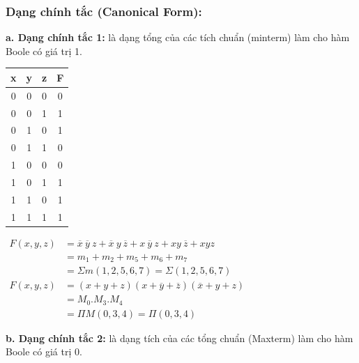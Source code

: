 \subsubsection{Dạng chính tắc (Canonical Form):}
\textbf{a. Dạng chính tắc 1:} là dạng tổng của các tích chuẩn (minterm) làm cho hàm Boole có giá trị 1.
\begin{table}[h!]
    \centering
    \begin{tabular}{|ccc|c|}
    \hline
    \textbf{x} & \textbf{y} & \textbf{z} & \textbf{F} \\ \hline
    0          & 0          & 0          & 0          \\
    0          & 0          & 1          & 1          \\
    0          & 1          & 0          & 1          \\
    0          & 1          & 1          & 0          \\
    1          & 0          & 0          & 0          \\
    1          & 0          & 1          & 1          \\
    1          & 1          & 0          & 1          \\
    1          & 1          & 1          & 1          \\ \hline
    \end{tabular}
    \qquad
    $\begin{aligned}
        F(x,y,z) &= \overline{x}\ \overline{y}\ z  + \overline{x}\ y\ \overline{z} + x\ \overline{y}\ z + xy\ \overline{z} + xyz \\
                 &= m_1 + m_2 + m_5 + m_6 + m_7 \\
                 &= \varSigma m(1,2,5,6,7) = \varSigma (1,2,5,6,7) \\
        F(x,y,z) &= (x+y+z)(x+ \overline{y} + \overline{z})(\overline{x} + y + z)\\
                 &= M_0 . M_3 . M_4 \\
                 &= \varPi M(0,3,4) = \varPi (0,3,4)
    \end{aligned}$
\end{table}

\textbf{b. Dạng chính tắc 2:} là dạng tích của các tổng chuẩn (Maxterm) làm cho hàm Boole có giá trị 0.

